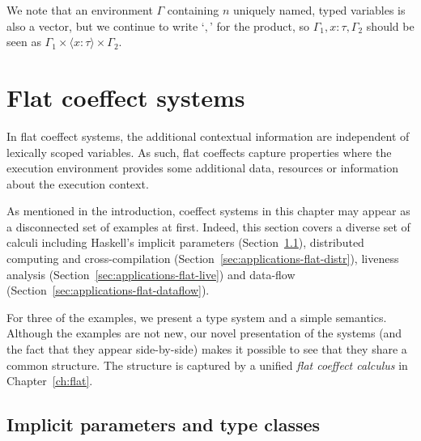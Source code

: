 We note that an environment $\Gamma$ containing $n$ uniquely named, typed variables is also a vector, 
but we continue to write `$,$' for the product, so $\Gamma_1, x\!:\!\tau, \Gamma_2$ should 
be seen as $\Gamma_1 \times \langle x\!:\!\tau\rangle \times \Gamma_2$.




%	                            
%	                            

\section{Flat coeffect systems}
\label{sec:applications-flat}

In flat coeffect systems, the additional contextual information are independent of lexically scoped
variables. As such, flat coeffects capture properties where the execution environment provides some 
additional data, resources or information about the execution context.

As mentioned in the introduction, coeffect systems in this chapter may appear as a disconnected
set of examples at first. Indeed, this section covers a diverse set of calculi including
Haskell's implicit parameters (Section~\ref{sec:applications-flat-impl}), distributed computing and 
cross-compilation (Section~\ref{sec:applications-flat-distr}), liveness analysis 
(Section~\ref{sec:applications-flat-live}) and data-flow (Section~\ref{sec:applications-flat-dataflow}).

For three of the examples, we present a type system and a simple semantics. Although the examples 
are not new, our novel presentation of the systems (and the fact that they appear side-by-side)
makes it possible to see that they share a common structure. The structure is captured by
a unified \emph{flat coeffect calculus} in Chapter~\ref{ch:flat}.


\subsection{Implicit parameters and type classes} 
\label{sec:applications-flat-impl}

